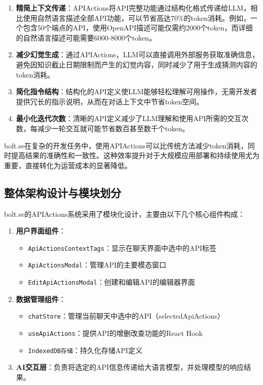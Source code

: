 \begin{enumerate}
  \item \textbf{精简上下文传递}：APIActions将API完整功能通过结构化格式传递给LLM，相比使用自然语言描述全部API功能，可以节省高达70\%的token消耗。例如，一个包含50个端点的API，使用OpenAPI描述可能仅需约2000个token，而详细的自然语言描述可能需要6000-8000个token。
  
  \item \textbf{减少幻觉生成}：通过APIActions，LLM可以直接调用外部服务获取准确信息，避免因知识截止日期限制而产生的幻觉内容，同时减少了用于生成猜测内容的token消耗。
  
  \item \textbf{简化指令结构}：结构化的API定义使LLM能够轻松理解可用操作，无需开发者提供冗长的指示说明，从而在对话上下文中节省token空间。
  
  \item \textbf{最小化迭代次数}：清晰的API定义减少了LLM理解和使用API所需的交互次数，每减少一轮交互就可能节省数百甚至数千个token。
\end{enumerate}

bolt.se在复杂的开发任务中，使用APIActions可以比传统方法减少token消耗，同时提高结果的准确性和一致性。这种效率提升对于大规模应用部署和持续使用尤为重要，直接转化为运营成本的显著降低。

\subsection{整体架构设计与模块划分}
bolt.se的APIActions系统采用了模块化设计，主要由以下几个核心组件构成：

\begin{enumerate}
  \item \textbf{用户界面组件}：
    \begin{itemize}
      \item \texttt{ApiActionsContextTags}：显示在聊天界面中选中的API标签
      \item \texttt{ApiActionsModal}：管理API的主要模态窗口
      \item \texttt{EditApiActionsModal}：创建和编辑API的编辑器界面
    \end{itemize}
  
  \item \textbf{数据管理组件}：
    \begin{itemize}
      \item \texttt{chatStore}：管理当前聊天中选中的API（selectedApiActions）
      \item \texttt{useApiActions}：提供API的增删改查功能的React Hook
      \item \texttt{IndexedDB存储}：持久化存储API定义
    \end{itemize}
  
  \item \textbf{AI交互层}：负责将选定的API信息传递给大语言模型，并处理模型的响应结果。
\end{enumerate}

